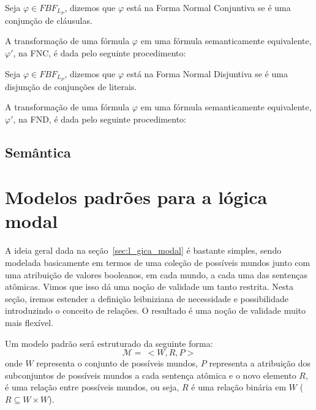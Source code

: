 
\begin{definition}
    Seja $\varphi \in FBF_{L_P}$, dizemos que $\varphi$ está na Forma Normal
    Conjuntiva se é uma conjunção de cláusulas.
\end{definition}

A transformação de uma fórmula $\varphi$ em uma fórmula semanticamente
equivalente, $\varphi '$, na FNC, é dada pelo seguinte procedimento:

\begin{definition}
    Seja $\varphi \in FBF_{L_P}$, dizemos que $\varphi$ está na Forma Normal
    Disjuntiva se é uma disjunção de conjunções de literais.
\end{definition}

A transformação de uma fórmula $\varphi$ em uma fórmula semanticamente
equivalente, $\varphi '$, na FND, é dada pelo seguinte procedimento:


\subsection{Semântica}

\section{Modelos padrões para a lógica modal}
\label{sec:modelos_padroes}

A ideia geral dada na seção~\ref{sec:l_gica_modal} é bastante simples, sendo
modelada basicamente em termos de uma coleção de possíveis mundos junto com uma
atribuição de valores booleanos, em cada mundo, a cada uma das sentenças
at\^omicas. Vimos que isso dá uma noção de validade um tanto restrita.
Nesta seção, iremos estender a definição leibniziana de necessidade e
possibilidade introduzindo o conceito de relações. O resultado é uma noção de
validade muito mais flexível.

Um modelo padrão será estruturado da seguinte forma:
\begin{equation}
    \label{eq:mod_padrao}
    \mathcal{M} =\ <W,R,P>
\end{equation}
onde $W$ representa o conjunto de possíveis mundos, $P$ representa a atribuição
dos subconjuntos de possíveis mundos a cada sentença at\^omica e o novo elemento
$R$, é uma relação entre possíveis mundos, ou seja, $R$ é uma relação binária em
$W$ ($R \subseteq W \times W$).

